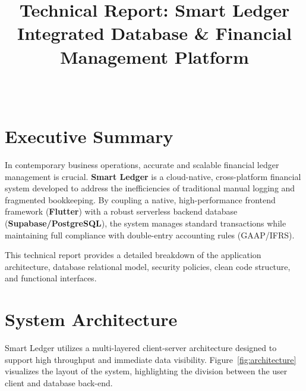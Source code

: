 \documentclass[journal, a4paper, onecolumn, 12pt]{IEEEtran}
\title{Technical Report: Smart Ledger \\ \Large Integrated Database \& Financial Management Platform}
\author{\IEEEauthorblockN{Project Team}\\ \IEEEauthorblockA{\textit{Smart Ledger Project} \\ Department of Computer Science \& Engineering \\ July 2026}}
\begin{document}
\maketitle
\tableofcontents
\newpage

\section{Executive Summary}
In contemporary business operations, accurate and scalable financial ledger management is crucial. \textbf{Smart Ledger} is a cloud-native, cross-platform financial system developed to address the inefficiencies of traditional manual logging and fragmented bookkeeping. By coupling a native, high-performance frontend framework (\textbf{Flutter}) with a robust serverless backend database (\textbf{Supabase/PostgreSQL}), the system manages standard transactions while maintaining full compliance with double-entry accounting rules (GAAP/IFRS).

This technical report provides a detailed breakdown of the application architecture, database relational model, security policies, clean code structure, and functional interfaces.

\section{System Architecture}
Smart Ledger utilizes a multi-layered client-server architecture designed to support high throughput and immediate data visibility. Figure~\ref{fig:architecture} visualizes the layout of the system, highlighting the division between the user client and database back-end.
\end{document}
